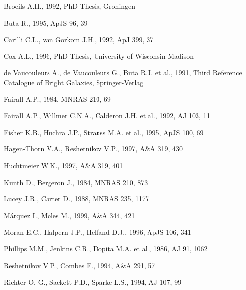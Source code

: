 \begin{thebibliography}{}

  Broeils  A.H.,  1992, PhD
Thesis, Groningen

 Buta R., 1995, ApJS 96, 39

 Carilli C.L.,
van Gorkom J.H., 1992, ApJ 399, 37

  Cox A.L.,  1996,  PhD  Thesis,
University of Wisconsin-Madison

   de
Vaucouleurs A., de Vaucouleurs G., Buta R.J.  et al., 1991, Third Reference
Catalogue of Bright Galaxies, Springer-Verlag

  Fairall  A.P., 1984, MNRAS
210, 69

  Fairall  A.P.,
Willmer C.N.A., Calderon J.H.  et al., 1992, AJ 103, 11

  Fisher  K.B.,
Huchra J.P., Strauss M.A.  et al., 1995, ApJS 100, 69

Hagen-Thorn V.A., Reshetnikov V.P., 1997, A\&A 319, 430

  Huchtmeier  W.K., 1997,
A\&A 319, 401

 Kunth D., Bergeron
J., 1984, MNRAS 210, 873

 Lucey J.R., Carter
D., 1988, MNRAS 235, 1177

  M\'arquez  I.,
Moles M., 1999, A\&A 344, 421

 Moran E.C., Halpern
J.P., Helfand D.J., 1996, ApJS 106, 341

  Phillips M.M.,
Jenkins C.R., Dopita M.A.  et al., 1986, AJ 91, 1062

 Reshetnikov
V.P., Combes F., 1994, A\&A 291, 57

  Richter O.-G.,
Sackett P.D., Sparke L.S., 1994, AJ 107, 99


\end{thebibliography}
